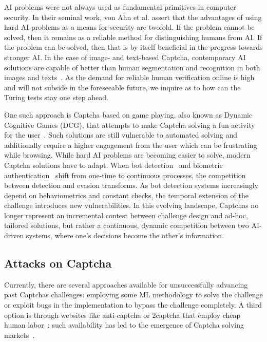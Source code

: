 AI problems were not always used as fundamental primitives in computer security.
In their seminal work, von Ahn et al. \cite{von2003captcha} assert that the advantages of using hard AI problems as a means for security are twofold.
If the problem cannot be solved, then it remains as a reliable method for distinguishing humans from AI.
If the problem can be solved, then that is by itself beneficial in the progress towards stronger AI.
In the case of image- and text-based Captcha, contemporary AI solutions are capable of better than human segmentation and recognition in both images and texts~\cite{bursztein2014end, sivakorn2016robot, karpathy2015deep}.
As the demand for reliable human verification online is high and will not subside in the foreseeable future, we inquire as to how can the Turing tests stay one step ahead.

One such approach is Captcha based on game playing, also known as Dynamic Cognitive Games (DCG), that attempts to make Captcha solving a fun activity for the user~\cite{mohamed2014three}.
Such solutions are still vulnerable to automated solving and additionally require a higher engagement from the user which can be frustrating while browsing.
While hard AI problems are becoming easier to solve, modern Captcha solutions have to adapt.
When bot detection~\cite{d2014avatar} and biometric authentication~\cite{fridman2015multi} shift from one-time to continuous processes, the competition between detection and evasion transforms.
As bot detection systems increasingly depend on behaviometrics and constant checks, the temporal extension of the challenge introduces new vulnerabilities.
In this evolving landscape, Captchas no longer represent an incremental contest between challenge design and ad-hoc, tailored solutions, but rather a continuous, dynamic competition between two AI-driven systems, where one's decisions become the other's information.

\subsection{Attacks on Captcha}

Currently, there are several approaches available for unsuccessfully advancing past Captchas challenges: employing some \gls{ML} methodology to solve the challenge or exploit bugs in the implementation to bypass the challenge completely.
A third option is through websites like anti-captcha or 2captcha that employ cheap human labor~\cite{weng2019towards}; such availability has led to the emergence of Captcha solving markets~\cite{motoyama2010re}.

